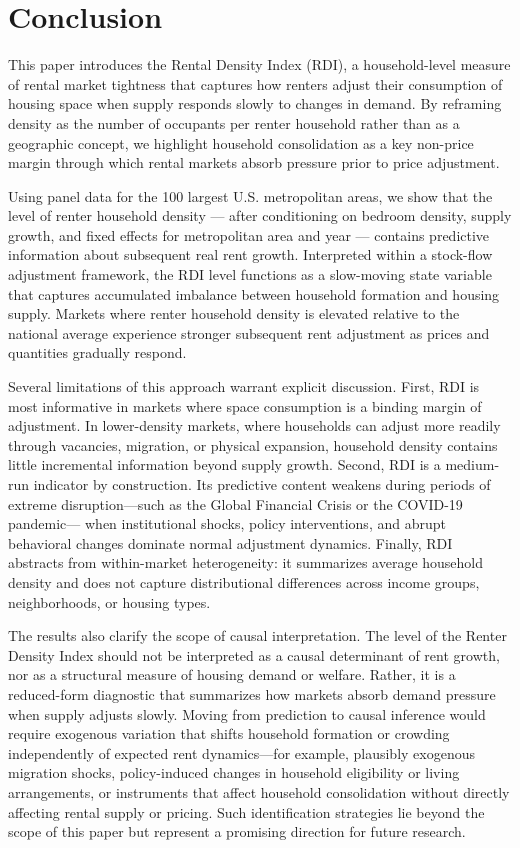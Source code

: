 \documentclass[pdflatex,sn-basic]{sn-jnl}%
\theoremstyle{thmstyleone}%
\theoremstyle{thmstyletwo}%
\theoremstyle{thmstylethree}%
\begin{document}
\section{Conclusion}\label{section6}

This paper introduces the Rental Density Index (RDI), a household-level measure of
rental market tightness that captures how renters adjust their consumption of housing
space when supply responds slowly to changes in demand. By reframing density as the
number of occupants per renter household rather than as a geographic concept, we
highlight household consolidation as a key non-price margin through which rental
markets absorb pressure prior to price adjustment.

Using panel data for the 100 largest U.S. metropolitan areas, we show that the level of renter household density — after conditioning on bedroom density, supply growth, and fixed effects for metropolitan area and year — contains predictive information about subsequent real rent growth. Interpreted within a stock-flow adjustment framework, the RDI level functions as a slow-moving state variable that captures accumulated imbalance between household formation and housing supply. Markets where renter household density is elevated relative to the national average experience stronger subsequent rent adjustment as prices and quantities gradually respond.

Several limitations of this approach warrant explicit discussion. First, RDI is most
informative in markets where space consumption is a binding margin of adjustment.
In lower-density markets, where households
can adjust more readily through vacancies, migration, or physical expansion, household
density contains little incremental information beyond supply growth. Second, RDI is a
medium-run indicator by construction. Its predictive content weakens during periods of
extreme disruption—such as the Global Financial Crisis or the COVID-19 pandemic—
when institutional shocks, policy interventions, and abrupt behavioral changes dominate
normal adjustment dynamics. Finally, RDI abstracts from within-market heterogeneity:
it summarizes average household density and does not capture distributional differences
across income groups, neighborhoods, or housing types.

The results also clarify the scope of causal interpretation. The level of the Renter Density Index should not
be interpreted as a causal determinant of rent growth, nor as a structural measure of
housing demand or welfare. Rather, it is a reduced-form diagnostic that summarizes how
markets absorb demand pressure when supply adjusts slowly. Moving from prediction to
causal inference would require exogenous variation that shifts household formation or
crowding independently of expected rent dynamics—for example, plausibly exogenous
migration shocks, policy-induced changes in household eligibility or living
arrangements, or instruments that affect household consolidation without directly
affecting rental supply or pricing. Such identification strategies lie beyond the scope
of this paper but represent a promising direction for future research.
\end{document}
